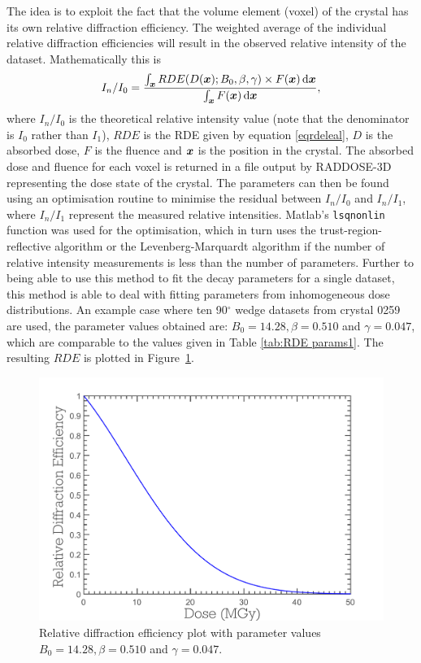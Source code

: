 The idea is to exploit the fact that the volume element (voxel) of the crystal has its own relative diffraction efficiency.
The weighted average of the individual relative diffraction efficiencies will result in the observed relative intensity of the dataset.
Mathematically this is
\begin{equation}
    I_n/I_0 = \frac{\int_{\boldsymbol{x}} RDE(D(\boldsymbol{x}); B_0, \beta, \gamma) \times F(\boldsymbol{x})\,\mathrm{d}\boldsymbol{x}}{\int_{\boldsymbol{x}} F(\boldsymbol{x})\,\mathrm{d}\boldsymbol{x}},
\end{equation}
where $I_n/I_0$ is the theoretical relative intensity value (note that the denominator is $I_0$ rather than $I_1$), $RDE$ is the RDE given by equation \ref{eqrdeleal}, $D$ is the absorbed dose, $F$ is the fluence and $\boldsymbol{x}$ is the position in the crystal.
The absorbed dose and fluence for each voxel is returned in a file output by RADDOSE-3D representing the dose state of the crystal.
The parameters can then be found using an optimisation routine to minimise the residual between $I_n/I_0$ and $I_n/I_1$, where $I_n/I_1$ represent the measured relative intensities.
Matlab's \verb+lsqnonlin+ function was used for the optimisation, which in turn uses the trust-region-reflective algorithm \cite{coleman1996} or the Levenberg-Marquardt algorithm \cite{more1978levenberg} if the number of relative intensity measurements is less than the number of parameters.
Further to being able to use this method to fit the decay parameters for a single dataset, this method is able to deal with fitting parameters from inhomogeneous dose distributions.
An example case where ten 90$^{\circ}$ wedge datasets from crystal 0259 are used, the parameter values obtained are: $B_0 = 14.28, \beta = 0.510$ and $\gamma = 0.047$, which are comparable to the values given in Table \ref{tab:RDE params1}.
The resulting $RDE$ is plotted in Figure~\ref{fig:Relative diffraction efficiency plot - ZDE}.
\begin{figure}
  \centering
    \includegraphics[width=1\textwidth]{figures/zde/RDEPlot_zde.pdf}
    \caption{Relative diffraction efficiency plot with parameter values $B_0 = 14.28, \beta = 0.510$ and $\gamma = 0.047$.}
    \label{fig:Relative diffraction efficiency plot - ZDE}
\end{figure}

